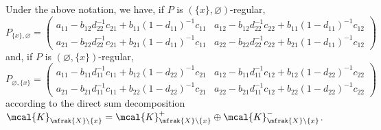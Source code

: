 \begin{Proposition}\label{prop:expression_cond_proj}
Under the above notation, we have, if $P$ is $(\{x\},\varnothing)$-regular,
\begin{equation*}
	P_{\{x\},\varnothing}=\left(
	\begin{matrix}
		a_{11}-b_{12}d_{22}^{-1}c_{21}+b_{11}(1-d_{11})^{-1}c_{11} & a_{12}-b_{12}d_{22}^{-1}c_{22}+b_{11}(1-d_{11})^{-1}c_{12}\\
		a_{21}-b_{22}d_{22}^{-1}c_{21}+b_{21}(1-d_{11})^{-1}c_{11} & a_{22}-b_{22}d_{22}^{-1}c_{22}+b_{21}(1-d_{11})^{-1}c_{12}
	\end{matrix}
	\right)
\end{equation*}
and, if $P$ is $(\varnothing,\{x\})$-regular,
\begin{equation*}
	P_{\varnothing,\{x\}}=\left(
	\begin{matrix}
		a_{11}-b_{11}d_{11}^{-1}c_{11}+b_{12}(1-d_{22})^{-1}c_{21} & a_{12}-b_{11}d_{11}^{-1}c_{12}+b_{12}(1-d_{22})^{-1}c_{22}\\
		a_{21}-b_{21}d_{11}^{-1}c_{11}+b_{22}(1-d_{22})^{-1}c_{21} & a_{22}-b_{21}d_{11}^{-1}c_{12}+b_{22}(1-d_{22})^{-1}c_{22}
	\end{matrix}
	\right)
\end{equation*}
according to the direct sum decomposition $\mcal{K}_{\mfrak{X}\backslash\{x\}}=\mcal{K}^{+}_{\mfrak{X}\backslash\{x\}}\oplus \mcal{K}^{-}_{\mfrak{X}\backslash\{x\}}$.
\end{Proposition}
